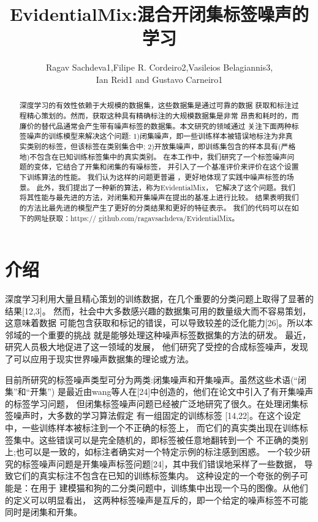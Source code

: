 \documentclass[12pt]{article}
\title{EvidentialMix:混合开闭集标签噪声的学习}
\author{Ragav Sachdeva1,Filipe R. Cordeiro2,Vasileios Belagiannis3,\\ Ian Reid1 and Gustavo Carneiro1}{}
\date{}
\begin{document}
\maketitle
\begin{abstract}
深度学习的有效性依赖于大规模的数据集，这些数据集是通过可靠的数据
获取和标注过程精心策划的。然而，获取这种具有精确标注的大规模数据集是非常
昂贵和耗时的，而廉价的替代品通常会产生带有噪声标签的数据集。本文研究的领域通过
关注下面两种标签噪声的训练模型来解决这个问题:
1)闭集噪声，即一些训练样本被错误地标注为非真实类别的标签，但该标签在类别集合中;
2)开放集噪声，即训练集包含的样本具有(严格地)不包含在已知训练标签集中的真实类别。
在本工作中，我们研究了一个标签噪声问题的变体，它结合了开集和闭集的有噪标签，
并引入了一个基准评价来评价在这个设置下训练算法的性能。
我们认为这样的问题更普遍 ，更好地体现了实践中噪声标签的场景。
此外，我们提出了一种新的算法，称为EvidentialMix， 
它解决了这个问题。我们将其性能与最先进的方法，对闭集和开集噪声在提出的基准上进行比较。
结果表明我们的方法比最先进的模型产生了更好的分类结果和更好的特征表示。
我们的代码可以在如下的网址获取：https:// github.com/ragavsachdeva/EvidentialMix。
\end{abstract}
\newpage
\section{介绍}
深度学习利用大量且精心策划的训练数据，在几个重要的分类问题上取得了显著的结果[12,3]。
然而，社会中大多数感兴趣的数据集可用的数量级大而不容易策划，这意味着数据
可能包含获取和标记的错误，可以导致较差的泛化能力[26]。所以本邻域的一个重要的挑战
就是能够处理这种噪声标签数据集的方法的研发。 最近，研究人员极大地促进了这一领域的发展，
他们研究了受控的合成标签噪声，发现了可以应用于现实世界噪声数据集的理论或方法。

目前所研究的标签噪声类型可分为两类:闭集噪声和开集噪声。虽然这些术语(“闭集”和“开集”) 
是最近由wang等人在[24]中创造的，他们在论文中引入了有开集噪声的标签学习问题，
但闭集标签噪声问题已经被广泛地研究了很久。在处理闭集标签噪声时，大多数的学习算法假定
有一组固定的训练标签 [14,22]。在这个设定中，一些训练样本被标注到一个不正确的标签上，
而它们的真实类出现在训练标签集中。这些错误可以是完全随机的，即标签被任意地翻转到一个
不正确的类别上;也可以是一致的，如标注者确实对一个特定示例的标注感到困惑。
一个较少研究的标签噪声问题是开集噪声标签问题[24]，其中我们错误地采样了一些数据，
导致它们的真实标注不包含在已知的训练标签集内。 这种设定的一个夸张的例子可能是：在用于
建模猫和狗的二分类问题中，训练集中出现一个马的图像。从他们的定义可以明显看出，
这两种标签噪声是互斥的，即一个给定的噪声标签不可能同时是闭集和开集。
\end{document}
